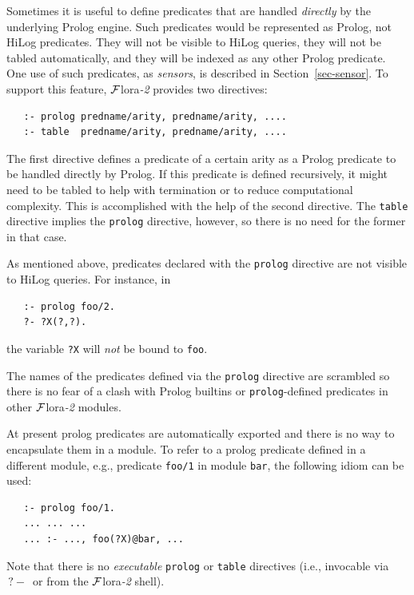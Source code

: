 \documentclass[11pt]{article}
\newcommand{\query}{\mbox{$\, ?\! - \, $}}                  %
\newcommand{\FLORA}{{\mbox{\sc ${\cal F}${lora}\rm\emph{-2}}}\xspace}
\begin{document}
Sometimes it is useful to define predicates that are handled
\emph{directly} by the underlying Prolog engine. Such predicates would be
represented as Prolog, not HiLog predicates. They will not be visible to
HiLog queries, they will not be tabled automatically,
and they will be indexed as any other Prolog predicate.
One use of such predicates, as \emph{sensors}, is described in
Section~\ref{sec-sensor}.
To support this feature, \FLORA provides two directives:
\begin{verbatim}
   :- prolog predname/arity, predname/arity, ....
   :- table  predname/arity, predname/arity, ....
\end{verbatim}
The first directive defines a predicate of a certain arity as a Prolog
predicate to be handled directly by Prolog. If this predicate is defined
recursively, it might need to be tabled to help with termination or to
reduce computational complexity. This is accomplished with the help of the
second directive. The \texttt{table} directive implies the \texttt{prolog}
directive, however, so there is no need for the former in that case.

As mentioned above, predicates declared with the \texttt{prolog} directive
are not visible to HiLog queries. For instance, in
\begin{verbatim}
   :- prolog foo/2.
   ?- ?X(?,?).
\end{verbatim}
the variable \texttt{?X} will \emph{not} be bound to \texttt{foo}.  

The names of the predicates defined via the \texttt{prolog} directive 
are scrambled so there is no fear of a clash with Prolog builtins or
\texttt{prolog}-defined  predicates in other \FLORA modules.

At present prolog predicates are automatically exported and there is no way
to encapsulate them in a module. To refer to a prolog predicate defined in
a different module, e.g., predicate \texttt{foo/1} in module \texttt{bar},
the following idiom can be used:
\begin{verbatim}
   :- prolog foo/1.
   ... ... ...
   ... :- ..., foo(?X)@bar, ...
\end{verbatim}
Note that there is no \emph{executable}  \texttt{prolog} or \texttt{table}
directives (i.e., invocable via $\query$ or from the \FLORA shell).
\end{document}
